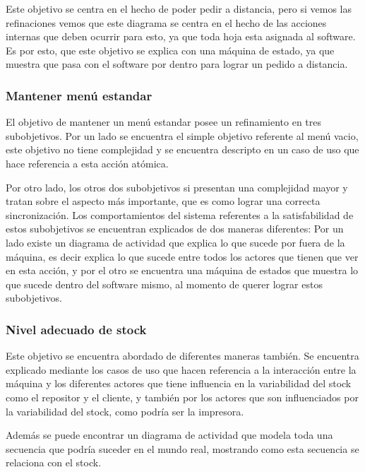 \documentclass[a4paper,10pt]{article}
\begin{document}
Este objetivo se centra en el hecho de poder pedir a distancia, pero si vemos las refinaciones vemos que este diagrama se centra en el hecho de las acciones internas que deben ocurrir para esto, ya que toda hoja esta asignada al software. Es por esto, que este objetivo se explica con una m\'aquina de estado, ya que muestra que pasa con el software por dentro para lograr un pedido a distancia.

 
\subsubsection*{Mantener men\'u estandar}

El objetivo de mantener un men\'u estandar posee un refinamiento en tres subobjetivos. Por un lado se encuentra el simple objetivo referente
al men\'u vacio, este objetivo no tiene complejidad y se encuentra descripto en un caso de uso que hace referencia a esta acci\'on at\'omica.

Por otro lado, los otros dos subobjetivos si presentan una complejidad mayor y tratan sobre el aspecto m\'as importante, que es como lograr una 
correcta sincronizaci\'on. Los comportamientos del sistema referentes a la satisfabilidad de estos subobjetivos se encuentran explicados de dos maneras
diferentes: Por un lado existe un diagrama de actividad que explica lo que sucede por fuera de la m\'aquina, es decir explica lo que sucede entre todos
los actores que tienen que ver en esta acci\'on, y por el otro se encuentra una m\'aquina de estados que muestra lo que sucede dentro del software
mismo, al momento de querer lograr estos subobjetivos.

\subsubsection*{Nivel adecuado de stock}

Este objetivo se encuentra abordado de diferentes maneras tambi\'en. Se encuentra explicado mediante los casos de uso que hacen referencia a la 
interacci\'on entre la m\'aquina y los diferentes actores que tiene influencia en la variabilidad del stock como el repositor y el cliente, y 
tambi\'en por los actores que son influenciados por la variabilidad del stock, como podr\'ia ser la impresora.

Adem\'as se puede encontrar un diagrama de actividad que modela toda una secuencia que podr\'ia suceder en el mundo real, mostrando como 
esta secuencia se relaciona con el stock.
\end{document}
